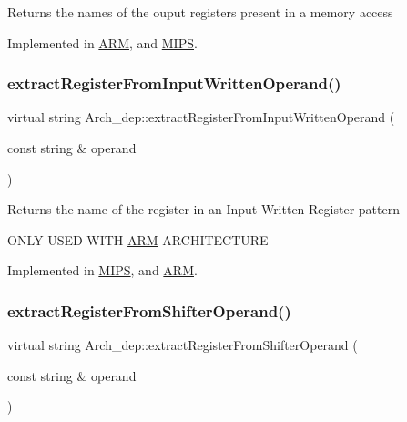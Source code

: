 Returns the names of the ouput registers present in a memory access 

Implemented in \hyperlink{classARM_a4d2fbc77b15f4672ed20f06cc44e4c4e}{A\+RM}, and \hyperlink{classMIPS_af03518e68285f24da7a0b2e16020d8d2}{M\+I\+PS}.

\mbox{\label{classArch__dep_a286da739265c852e98f2efd622615b96}} 
\subsubsection{\texorpdfstring{extract\+Register\+From\+Input\+Written\+Operand()}{extractRegisterFromInputWrittenOperand()}}
{\footnotesize\ttfamily virtual string Arch\+\_\+dep\+::extract\+Register\+From\+Input\+Written\+Operand (\begin{DoxyParamCaption}\item[{const string \&}]{operand }\end{DoxyParamCaption})\hspace{0.3cm}{\ttfamily [pure virtual]}}

Returns the name of the register in an Input Written Register pattern

O\+N\+LY U\+S\+ED W\+I\+TH \hyperlink{classARM}{A\+RM} A\+R\+C\+H\+I\+T\+E\+C\+T\+U\+RE 

Implemented in \hyperlink{classMIPS_a53017c6d42bb7bee24a36e45bf0300b9}{M\+I\+PS}, and \hyperlink{classARM_a32da27e5c024c3291b12a62ffc2b3070}{A\+RM}.

\mbox{\label{classArch__dep_a58002697a2ce55ff09eee606807cfab3}} 
\subsubsection{\texorpdfstring{extract\+Register\+From\+Shifter\+Operand()}{extractRegisterFromShifterOperand()}}
{\footnotesize\ttfamily virtual string Arch\+\_\+dep\+::extract\+Register\+From\+Shifter\+Operand (\begin{DoxyParamCaption}\item[{const string \&}]{operand }\end{DoxyParamCaption})\hspace{0.3cm}{\ttfamily [pure virtual]}}

